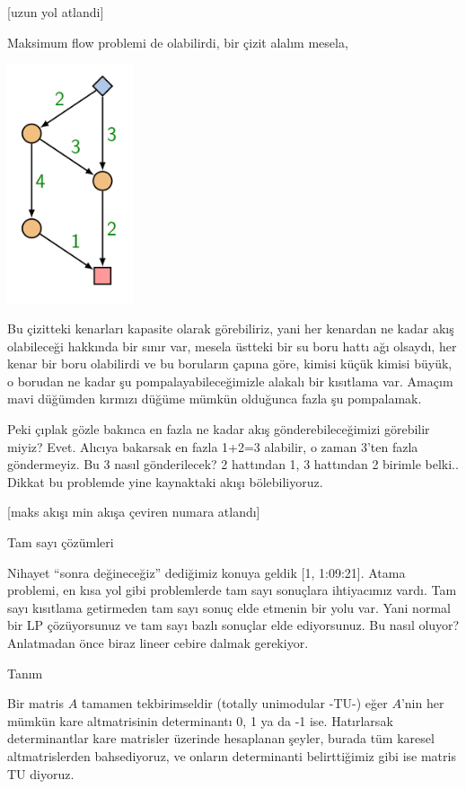\documentclass[12pt,fleqn]{article}\usepackage{../../common}
\begin{document}
[uzun yol atlandi]

Maksimum flow problemi de olabilirdi, bir çizit alalım mesela,

\includegraphics[width=10em]{func_90_nflow_10.png}

Bu çizitteki kenarları kapasite olarak görebiliriz, yani her kenardan ne
kadar akış olabileceği hakkında bir sınır var, mesela üstteki bir su boru
hattı ağı olsaydı, her kenar bir boru olabilirdi ve bu boruların çapına
göre, kimisi küçük kimisi büyük, o borudan ne kadar şu
pompalayabileceğimizle alakalı bir kısıtlama var. Amaçım mavi düğümden
kırmızı düğüme mümkün olduğunca fazla şu pompalamak. 

Peki çıplak gözle bakınca en fazla ne kadar akış gönderebileceğimizi
görebilir miyiz? Evet. Alıcıya bakarsak en fazla 1+2=3 alabilir, o zaman
3'ten fazla göndermeyiz. Bu 3 nasıl gönderilecek? 2 hattından 1, 3
hattından 2 birimle belki.. Dikkat bu problemde yine kaynaktaki akışı
bölebiliyoruz. 

[maks akışı min akışa çeviren numara atlandı]

Tam sayı çözümleri

Nihayet ``sonra değineceğiz'' dediğimiz konuya geldik [1, 1:09:21]. Atama
problemi, en kısa yol gibi problemlerde tam sayı sonuçlara ihtiyacımız
vardı. Tam sayı kısıtlama getirmeden tam sayı sonuç elde etmenin bir yolu
var. Yani normal bir LP çözüyorsunuz ve tam sayı bazlı sonuçlar elde
ediyorsunuz. Bu nasıl oluyor? Anlatmadan önce biraz lineer cebire dalmak
gerekiyor. 

Tanım

Bir matris $A$ tamamen tekbirimseldir (totally unimodular -TU-) eğer
$A$'nin her mümkün kare altmatrisinin determinantı 0, 1 ya da -1
ise. Hatırlarsak determinantlar kare matrisler üzerinde hesaplanan şeyler,
burada tüm karesel altmatrislerden bahsediyoruz, ve onların determinanti
belirttiğimiz gibi ise matris TU diyoruz. 
\end{document}
